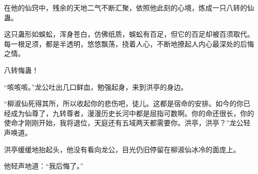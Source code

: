 \begin{this_body}
在他的仙窍中，残余的天地二气不断汇聚，依照他此刻的心境，炼成一只八转的仙蛊。

这只蛊形如蜈蚣，浑身苍白，仿佛纸质，蜈蚣有百足，但它的百足却被百须取代。每一根足须，都是半透明，悠悠飘荡，挠着人心，不断地撩起人内心最深处的后悔之情。

八转悔蛊！

“咳咳咳。”龙公吐出几口鲜血，勉强起身，来到洪亭的身边。

“柳淑仙死得其所，所以收起你的悲伤吧，徒儿。这都是宿命的安排。如今的你已经成为仙尊了，九转尊者，漫漫历史长河中都是屈指可数啊。你的命还很长，你的使命才刚刚开始，我将退位，天庭还有五域两天都需要你。洪亭，洪亭？”龙公轻声唤道。

洪亭缓缓地抬起头，他没有看向龙公，目光仍旧停留在柳淑仙冰冷的面庞上。

他轻声地道：“我后悔了。”

\end{this_body}

